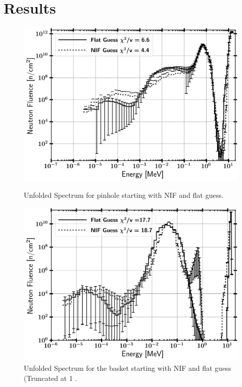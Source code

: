 \documentclass[journal]{IEEEtran}
\let\MYoriglatexcaption\caption
\renewcommand{\caption}[2][\relax]{\MYoriglatexcaption[#2]{#2}}
\begin{document}
{	\section{Results}
	
	\begin{figure}[t!]
		\includegraphics[width=\linewidth]{Figures/PinBothLog.png}
		\caption{Unfolded Spectrum for pinhole starting with NIF and flat guess.}
		\label{fig:pin}
		\vskip 0.9cm
		\includegraphics[width=\linewidth]{Figures/BaskBothLogZoomed.png}
		\caption{Unfolded Spectrum for the basket starting with NIF and flat guess (Truncated at 1 \text{$n-cm^{-2}$)}.}

\end{figure}}
\end{document}
